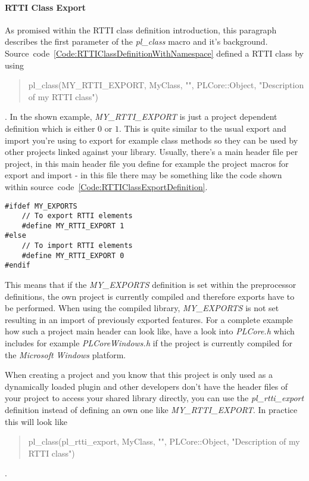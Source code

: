 \paragraph{\ac{RTTI} Class Export}
As promised within the \ac{RTTI} class definition introduction, this paragraph describes the first parameter of the \emph{pl\_class} macro and it's background. Source~code~\ref{Code:RTTIClassDefinitionWithNamespace} defined a \ac{RTTI} class by using \begin{quote}pl\_class(MY\_RTTI\_EXPORT, MyClass, "", PLCore::Object, "Description of my RTTI class")\end{quote}. In the shown example, \emph{MY\_RTTI\_EXPORT} is just a project dependent definition which is either $0$ or $1$. This is quite similar to the usual export and import you're using to export for example class methods so they can be used by other projects linked against your library. Usually, there's a main header file per project, in this main header file you define for example the project macros for export and import - in this file there may be something like the code shown within source~code~\ref{Code:RTTIClassExportDefinition}.
\begin{lstlisting}[float=htb,label=Code:RTTIClassExportDefinition,caption={\ac{RTTI} class export definition}]
#ifdef MY_EXPORTS
	// To export RTTI elements
	#define MY_RTTI_EXPORT 1
#else
	// To import RTTI elements
	#define MY_RTTI_EXPORT 0
#endif
\end{lstlisting}
This means that if the \emph{MY\_EXPORTS} definition is set within the preprocessor definitions, the own project is currently compiled and therefore exports have to be performed. When using the compiled library, \emph{MY\_EXPORTS} is not set resulting in an import of previously exported features. For a complete example how such a project main header can look like, have a look into \emph{PLCore.h} which includes for example \emph{PLCoreWindows.h} if the project is currently compiled for the \emph{Microsoft Windows} platform.

When creating a project and you know that this project is only used as a dynamically loaded plugin and other developers don't have the header files of your project to access your shared library directly, you can use the \emph{pl\_rtti\_export} definition instead of defining an own one like \emph{MY\_RTTI\_EXPORT}. In practice this will look like \begin{quote}pl\_class(pl\_rtti\_export, MyClass, "", PLCore::Object, "Description of my RTTI class")\end{quote}.


